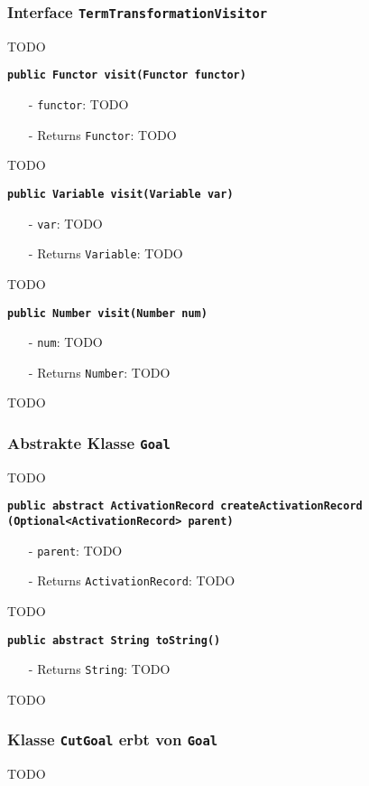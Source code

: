 \documentclass[parskip=full,11pt,twoside]{scrartcl}
\begin{document}
\subsubsection{Interface \texttt{TermTransformationVisitor}}
TODO

\textbf{\texttt{public Functor visit(Functor functor)}}
\begin{itemize}[noitemsep]
	\item[-] \texttt{functor}: TODO
	\item[-] Returns \texttt{Functor}: TODO
\end{itemize}
TODO

\textbf{\texttt{public Variable visit(Variable var)}}
\begin{itemize}[noitemsep]
	\item[-] \texttt{var}: TODO
	\item[-] Returns \texttt{Variable}: TODO
\end{itemize}
TODO

\textbf{\texttt{public Number visit(Number num)}}
\begin{itemize}[noitemsep]
	\item[-] \texttt{num}: TODO
	\item[-] Returns \texttt{Number}: TODO
\end{itemize}
TODO
\subsubsection{Abstrakte Klasse \texttt{Goal}}
TODO

\textbf{\texttt{public abstract ActivationRecord createActivationRecord\\(Optional<ActivationRecord> parent)}}
\begin{itemize}[noitemsep]
	\item[-] \texttt{parent}: TODO
	\item[-] Returns \texttt{ActivationRecord}: TODO
\end{itemize}
TODO

\textbf{\texttt{public abstract String toString()}}
\begin{itemize}[noitemsep]
	\item[-] Returns \texttt{String}: TODO
\end{itemize}
TODO

\subsubsection{Klasse \texttt{CutGoal} erbt von \texttt{Goal}}
TODO
\end{document}
